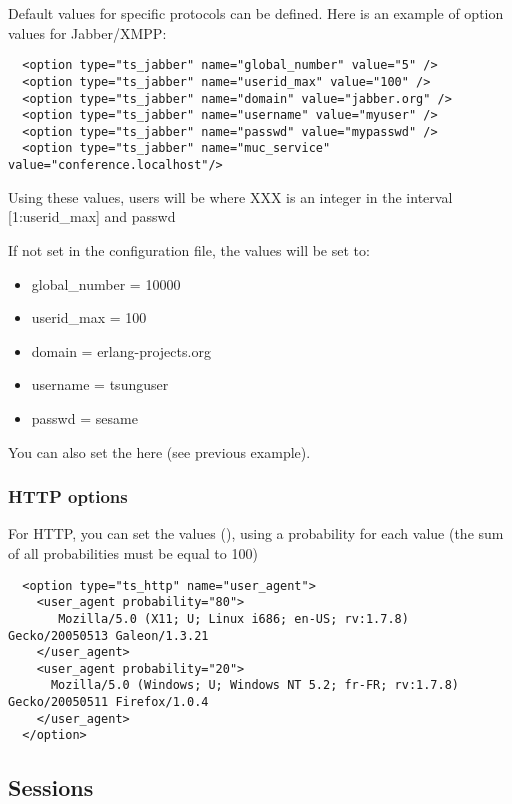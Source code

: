 \documentclass{TSUNG-en}
\begin{document}
Default values for specific protocols can be defined. Here is an
example of option values for Jabber/XMPP:

\begin{Verbatim}
  <option type="ts_jabber" name="global_number" value="5" />
  <option type="ts_jabber" name="userid_max" value="100" />
  <option type="ts_jabber" name="domain" value="jabber.org" />
  <option type="ts_jabber" name="username" value="myuser" />
  <option type="ts_jabber" name="passwd" value="mypasswd" />
  <option type="ts_jabber" name="muc_service" value="conference.localhost"/>
\end{Verbatim}

Using these values, users will be  where XXX is an integer in
the interval [1:userid\_max] and passwd  

If not set in the configuration file, the values will be set to:
\begin{itemize}
\item global\_number = 10000
\item userid\_max    = 100
\item domain   = erlang-projects.org
\item username = tsunguser
\item passwd   = sesame
\end{itemize}

You can also set the  here (see previous example).

\subsubsection{HTTP options}

For HTTP, you can set the  values
(), using a probability for each
value (the sum of all probabilities must be equal to 100)

\begin{Verbatim}
  <option type="ts_http" name="user_agent">
    <user_agent probability="80">
       Mozilla/5.0 (X11; U; Linux i686; en-US; rv:1.7.8) Gecko/20050513 Galeon/1.3.21
    </user_agent>
    <user_agent probability="20">
      Mozilla/5.0 (Windows; U; Windows NT 5.2; fr-FR; rv:1.7.8) Gecko/20050511 Firefox/1.0.4
    </user_agent>
  </option>
\end{Verbatim}

\subsection{Sessions}
\label{sec:sessions}
\end{document}
